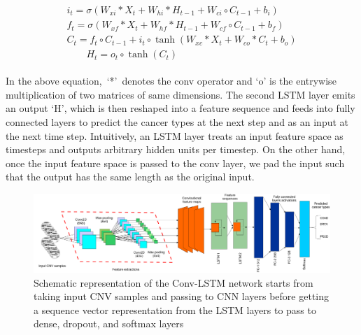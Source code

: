 \vspace{-4mm}
\begin{align}
    \begin{array}{c}
            {i_{t}=\sigma\left(W_{x i} * {X}_{t}+W_{h i} * {H}_{t-1}+W_{c i} \circ {C}_{t-1}+b_{i}\right)} \\
            {f_{t}=\sigma\left(W_{x f} * {X}_{t}+W_{h f} * {H}_{t-1}+W_{c f} \circ {C}_{t-1}+b_{f}\right)} \\
            {{C}_{t}=f_{t} \circ {C}_{t-1}+i_{t} \circ \tanh \left(W_{x c} * {X}_{t}+W_{c o} * {C}_{t}+b_{o}\right)} \\
            {\qquad {H}_{t}=o_{t} \circ \tanh \left({C}_{t}\right)}
    \end{array}
\end{align}
\vspace{-4mm}

\hspace*{3.5mm} In the above equation,~`*'~denotes the conv operator and `o' is the entrywise multiplication of two matrices of same dimensions. The second LSTM layer emits an output `H', which is then reshaped into a feature sequence and feeds into fully connected layers to predict the cancer types at the next step and as an input at the next time step. Intuitively, an LSTM layer treats an input feature space as timesteps and outputs arbitrary hidden units per timestep. On the other hand, once the input feature space is passed to the conv layer, we pad the input such that the output has the same length as the original input. 

\begin{figure}
	\centering
	\includegraphics[scale=0.5]{images/conv_lstm.png} 
	\caption[Schematic representation of the convolutional-LSTM network]{Schematic representation of the Conv-LSTM network starts from taking input CNV samples and passing to CNN layers before getting a sequence vector representation from the LSTM layers to pass to dense, dropout, and softmax layers~\cite{karimACCA2019}}	
	\label{fig:conv_lstm}
	\vspace{-2mm}
\end{figure}

